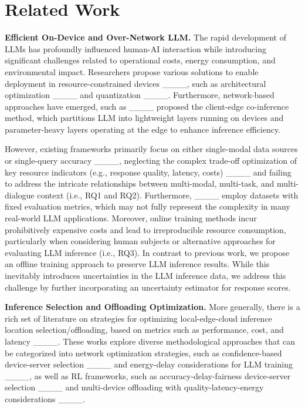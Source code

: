 \section{Related Work}
\label{Sec. Related Work}

\textbf{Efficient On-Device and Over-Network LLM.} The rapid development of LLMs has profoundly influenced human-AI interaction while introducing significant challenges related to operational costs, energy consumption, and environmental impact. Researchers propose various solutions to enable deployment in resource-constrained devices ____, such as architectural optimization ____ and quantization ____. Furthermore, network-based approaches have emerged, such as ____ proposed the client-edge co-inference method, which partitions LLM into lightweight layers running on devices and parameter-heavy layers operating at the edge to enhance inference efficiency.

However, existing frameworks primarily focus on either single-modal data sources or single-query accuracy ____, neglecting the complex trade-off optimization of key resource indicators (e.g., response quality, latency, costs) ____ and failing to address the intricate relationships between multi-modal, multi-task, and multi-dialogue context (i.e., RQ1 and RQ2). Furthermore, ____ employ datasets with fixed evaluation metrics, which may not fully represent the complexity in many real-world LLM applications. Moreover, online training methods incur prohibitively expensive costs and lead to irreproducible resource consumption, particularly when considering human subjects or alternative approaches for evaluating LLM inference (i.e., RQ3). In contrast to previous work, we propose an offline training approach to preserve LLM inference results. While this inevitably introduces uncertainties in the LLM inference data, we address this challenge by further incorporating an uncertainty estimator for response scores.


\noindent\textbf{Inference Selection and Offloading Optimization.} More generally, there is a rich set of literature on strategies for optimizing local-edge-cloud inference location selection/offloading, based on metrics such as performance, cost, and latency ____. These works explore diverse methodological approaches that can be categorized into network optimization strategies, such as confidence-based device-server selection ____ and energy-delay considerations for LLM training ____, as well as RL frameworks, such as accuracy-delay-fairness device-server selection ____ and multi-device offloading with quality-latency-energy considerations ____.

